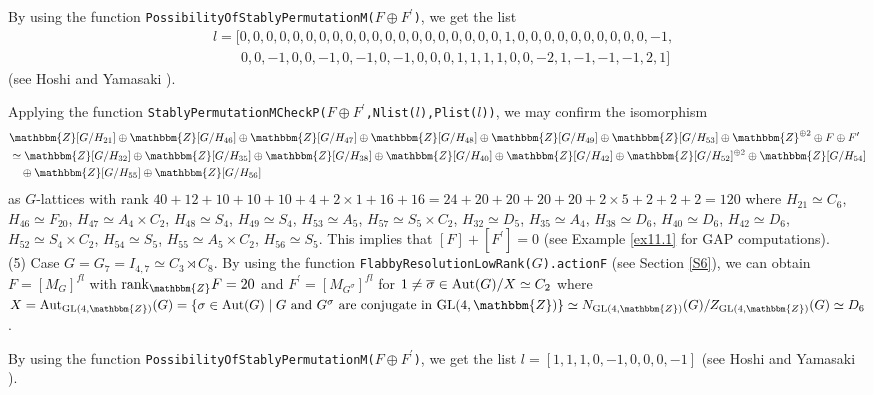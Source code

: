 \documentclass{amsart}
\theoremstyle{plain}
\theoremstyle{definition}
\theoremstyle{remark}
\newcommand{\bZ}{\mathbbm{Z}}\newcommand{\bQ}{\mathbbm{Q}}
\newcommand{\GL}{{\rm GL}}\newcommand{\SL}{{\rm SL}}
\begin{document}
{By using the function 
{\tt PossibilityOfStablyPermutationM(}$F\oplus F^\prime${\tt )}, 
we get the list
\begin{align*}
&l=[0,0,0,0,0,0,0,0,0,0,0,0,0,0,0,0,0,0,0,0,1,0,0,0,0,0,0,0,0,0,0,-1,\\
&\qquad 0,0,-1,0,0,-1,0,-1,0,-1,0,0,0,1,1,1,1,0,0,-2,1,-1,-1,-1,2,1]
\end{align*} 
(see Hoshi and Yamasaki \cite[Section 5.5]{HY17}). 

Applying the function 
{\tt StablyPermutationMCheckP(}$F\oplus F^\prime${\tt ,Nlist(}$l${\tt ),Plist(}$l${\tt ))}, 
we may confirm the isomorphism 
\begin{align*}
&\bZ[G/H_{21}]\oplus\bZ[G/H_{46}]\oplus \bZ[G/H_{47}]\oplus 
\bZ[G/H_{48}]\oplus \bZ[G/H_{49}]\oplus \bZ[G/H_{53}]\oplus 
\bZ^{\oplus 2}\oplus F\oplus F^\prime\\
&\simeq 
 \bZ[G/H_{32}]\oplus \bZ[G/H_{35}]\oplus 
 \bZ[G/H_{38}]\oplus  \bZ[G/H_{40}]\oplus  \bZ[G/H_{42}]\oplus 
 \bZ[G/H_{52}]^{\oplus 2}\oplus 
 \bZ[G/H_{54}]\\
&\quad \oplus  \bZ[G/H_{55}]\oplus  \bZ[G/H_{56}]
\end{align*} 
as $G$-lattices 
with rank 
$40+12+10+10+10+4+2\times 1+16+16=24+20+20+20+20+2\times 5+2+2+2=120$ 
where 
$H_{21}\simeq C_6$, 
$H_{46}\simeq F_{20}$, 
$H_{47}\simeq A_4\times C_2$, 
$H_{48}\simeq S_4$, 
$H_{49}\simeq S_4$, 
$H_{53}\simeq A_5$, 
$H_{57}\simeq S_5\times C_2$, 
%
$H_{32}\simeq D_5$, 
$H_{35}\simeq A_4$, 
$H_{38}\simeq D_6$, 
$H_{40}\simeq D_6$, 
$H_{42}\simeq D_6$, 
$H_{52}\simeq S_4\times C_2$, 
$H_{54}\simeq S_5$, 
$H_{55}\simeq A_5\times C_2$, 
$H_{56}\simeq S_5$. 
This implies that $[F]+[F^\prime]=0$ (see Example \ref{ex11.1} for GAP computations).\\

(5) Case $G=G_7=I_{4,7}\simeq C_3\rtimes C_8$. 
By using the function 
{\tt FlabbyResolutionLowRank(}$G${\tt).actionF} (see Section \ref{S6}), 
we can obtain $F=[M_G]^{fl}$ with ${\rm rank}_\bZ F=20$ 
and $F^\prime=[M_{G^\sigma}]^{fl}$ for 
$1\neq\overline{\sigma}\in {\rm Aut}(G)/X\simeq C_2$ 
where $X={\rm Aut}_{\GL(4,\bZ)}(G)=\{\sigma\in{\rm Aut}(G)\mid G\ {\rm and}\ G^\sigma\ {\rm are}\ 
{\rm conjugate}\ {\rm in}\ \GL(4,\bZ)\}\simeq N_{\GL(4,\bZ)}(G)/Z_{\GL(4,\bZ)}(G)\simeq D_6$. 

By using the function 
{\tt PossibilityOfStablyPermutationM(}$F\oplus F^\prime${\tt )}, 
we get the list $l=[ 1, 1, 1, 0, -1, 0, 0, 0, -1 ]$ 
(see Hoshi and Yamasaki \cite[Section 5.5]{HY17}). 

}
\end{document}
